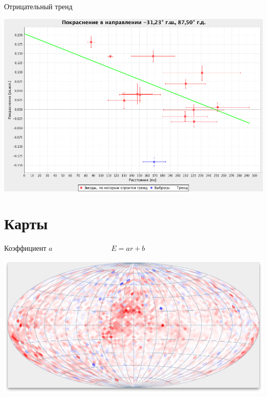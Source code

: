 \documentclass[14pt, fleqn, xcolor={dvipsnames, table}]{beamer}
\begin{document}
        \begin{frame}{Отрицательный тренд}
            \begin{center}
                \includegraphics[scale=0.35]{real-4.png}
            \end{center}             
        \end{frame}
        
    \section{Карты}            
        
        \begin{frame}{Коэффициент $a$ ~~~~~~~~~~~~~~~ $E = a r + b$}
            \begin{center}
                \includegraphics[scale=0.32]{map-a-white.png}
            \end{center}             
        \end{frame}
        
\end{document}
